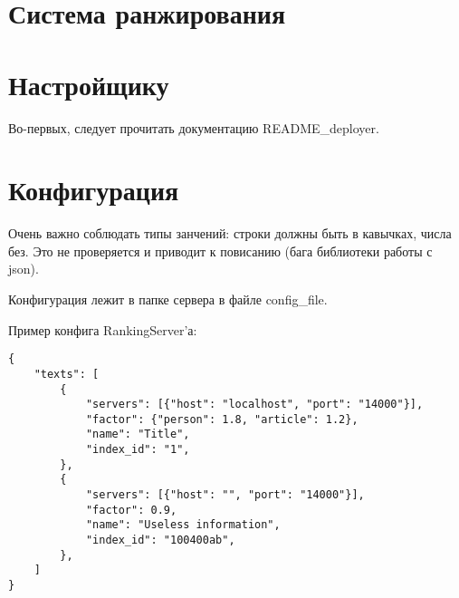 \documentclass[12pt,a4paper]{article}
\begin{document}
\section{Система ранжирования}

\section{Настройщику}
Во-первых, следует прочитать документацию README\_deployer.

\section{Конфигурация}
Очень важно соблюдать типы занчений: строки должны быть в кавычках, числа без. Это не проверяется и приводит к повисанию (бага библиотеки работы с json).

Конфигурация лежит в папке сервера в файле config\_file.

Пример конфига RankingServer'а:
\begin{verbatim}
{
	"texts": [
		{
			"servers": [{"host": "localhost", "port": "14000"}],
			"factor": {"person": 1.8, "article": 1.2},
			"name": "Title",
			"index_id": "1",
		},
		{
			"servers": [{"host": "", "port": "14000"}],
			"factor": 0.9,
			"name": "Useless information",
			"index_id": "100400ab",
		},
	]
}
\end{verbatim}
\end{document}
